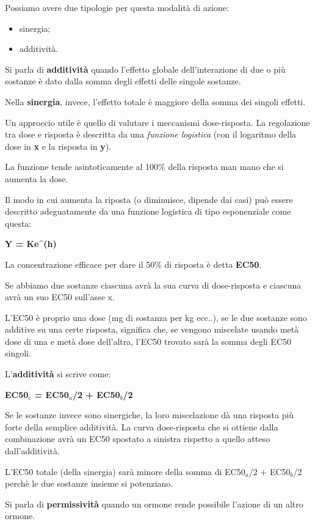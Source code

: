 \documentclass[]{article}
\begin{document}
Possiamo avere due tipologie per questa modalità di azione:

\begin{itemize}
\itemsep1pt\parskip0pt
\item
  sinergia;
\item
  additività.
\end{itemize}

Si parla di \textbf{additività} quando l'effetto globale
dell'interazione di due o più sostanze è dato dalla somma degli effetti
delle singole sostanze.

Nella \textbf{sinergia}, invece, l'effetto totale è maggiore della somma
dei singoli effetti.

Un approccio utile è quello di valutare i meccanismi dose-risposta. La
regolazione tra dose e risposta è descritta da una \emph{funzione
logistica} (con il logaritmo della dose in \textbf{x} e la risposta in
\textbf{y}).

La funzione tende asintoticamente al 100\% della risposta man mano che
si aumenta la dose.

Il modo in cui aumenta la riposta (o diminuisce, dipende dai casi) può
essere descritto adeguatamente da una funzione logistica di tipo
esponenziale come questa:

\textbf{Y = Ke\^{}(h)}

La concentrazione efficace per dare il 50\% di risposta è detta
\textbf{EC50}.

Se abbiamo due sostanze ciascuna avrà la sua curva di dose-risposta e
ciascuna avrà un suo EC50 sull'asse x.

L'EC50 è proprio una dose (mg di sostanza per kg ecc..), se le due
sostanze sono additive su una certe risposta, significa che, se vengono
miscelate usando metà dose di una e metà dose dell'altra, l'EC50 trovato
sarà la somma degli EC50 singoli.

L'\textbf{additività} si scrive come:

\textbf{EC50\(_c\) = EC50\(_a\)/2 + EC50\(_b\)/2}

Se le sostanze invece sono sinergiche, la loro miscelazione dà una
risposta più forte della semplice additività. La curva dose-risposta che
si ottiene dalla combinazione avrà un EC50 spostato a sinistra rispetto
a quello atteso dall'additività.

L'EC50 totale (della sinergia) sarà minore della somma di EC50\(_a\)/2 +
EC50\(_b\)/2 perchè le due sostanze insieme si potenziano.

Si parla di \textbf{permissività} quando un ormone rende possibile
l'azione di un altro ormone.
\end{document}
